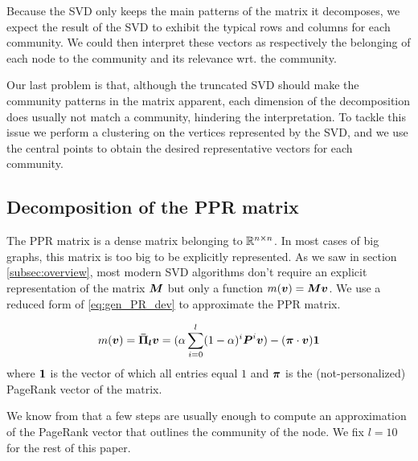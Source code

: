 Because the SVD only keeps the main patterns of the matrix it decomposes, we expect the result of the SVD to exhibit the typical rows and columns for each community.
We could then interpret these vectors as respectively the belonging of each node to the community and its relevance wrt.  the community.%

Our last problem is that, although the truncated SVD should make the community patterns in the matrix apparent, each dimension of the decomposition does usually not match a community, hindering the interpretation. To tackle this issue we perform a clustering on the vertices represented by the SVD, and we use the central points to obtain the desired representative vectors for each community. %

\subsection{Decomposition of the PPR matrix}
The PPR matrix is a dense matrix belonging to $\mathbb{R}^{n\times n}$. In most cases of big graphs, this matrix is too big to be explicitly represented. As we saw in section \ref{subsec:overview}, most modern SVD algorithms don't require an explicit representation of the matrix $\boldsymbol{M}$ but only a function $m(\boldsymbol{v}) = \boldsymbol{M}\boldsymbol{v}$. We use a reduced form of \eqref{eq:gen_PR_dev} to approximate the PPR matrix.

\begin{equation}
    m(\boldsymbol{v}) = \boldsymbol{\Bar{\Pi}_l}\boldsymbol{v} = (\alpha \sum_{i=0}^l (1-\alpha)^i\boldsymbol{P}^i\boldsymbol{v}) - (\boldsymbol{\pi} \cdot \boldsymbol{v}) \boldsymbol{1}
\end{equation}
\noindent where $\boldsymbol{1}$ is the vector of which all entries equal $1$ and $\boldsymbol{\pi}$ is the (not-personalized) PageRank vector of the matrix.

We know from \cite{Kloumann2014} that a few steps are usually enough to compute an approximation of the PageRank vector that outlines the community of the node. We fix $l=10$ for the rest of this paper.

